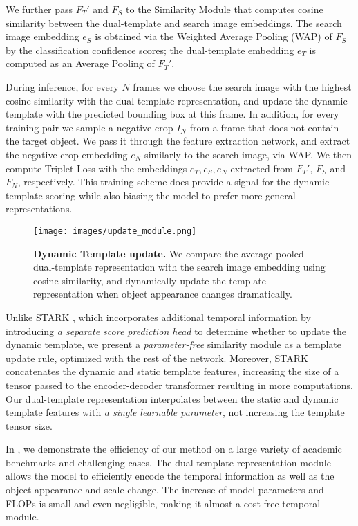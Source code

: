 \documentclass[runningheads]{llncs}
\begin{document}
We further pass $F_T'$ and $F_S$ to the Similarity Module that computes cosine similarity between the dual-template and search image embeddings. 
The search image embedding $e_S$ is obtained via the Weighted Average Pooling (WAP) \cite{WAP} of $F_S$ by the classification confidence scores; the dual-template embedding $e_T$ is computed as an Average Pooling \cite{AvgPool} of $F_T'$.

During inference, for every $N$ frames we choose the search image with the highest cosine similarity with the dual-template representation, and update the dynamic template with the predicted bounding box at this frame. 
In addition, for every training pair we sample a negative crop $I_N$ from a frame that does not contain the target object. 
We pass it through the feature extraction network, and extract the negative crop embedding $e_N$ similarly to the search image, via WAP.
We then compute Triplet Loss \cite{TripletLoss} with the embeddings $e_T, e_S, e_N$ extracted from $F_T'$, $F_S$ and $F_N$, respectively. 
This training scheme does provide a signal for the dynamic template scoring while also biasing the model to prefer more general representations.


\begin{figure}[t]\centering
  \texttt{[image: images/update\_module.png]}
\caption{\textbf{Dynamic Template update.} We compare the average-pooled dual-template representation with the search image embedding using cosine similarity, and dynamically update the template representation when object appearance changes dramatically.}
\label{fig:update}
\end{figure}

Unlike STARK \cite{STARK}, which incorporates additional temporal information by introducing \textit{a separate score prediction head} to determine whether to update the dynamic template, we present a \textit{parameter-free} similarity module as a template update rule, optimized with the rest of the network.
Moreover, STARK concatenates the dynamic and static template features, increasing the size of a tensor passed to the encoder-decoder transformer resulting in more computations.
Our dual-template representation interpolates between the static and dynamic template features with \textit{a single learnable parameter}, not increasing the template tensor size.

In , we demonstrate the efficiency of our method on a large variety of academic benchmarks and challenging cases. 
The dual-template representation module allows the model to efficiently encode the temporal information as well as the object appearance and scale change. The increase of model parameters and FLOPs is small and even negligible, making it almost a cost-free temporal module.
\end{document}
